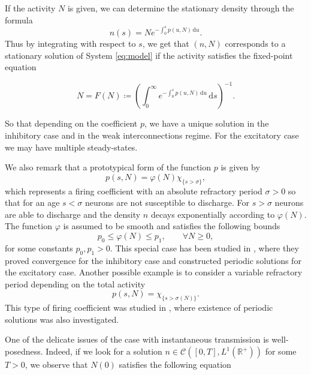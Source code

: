 \documentclass[11pt,a4paper]{article}
\newcommand{\R}{\mathbb{R}}
\newcommand{\dd}{\mathrm{d}}
\begin{document}
If the activity $N$ is given, we can determine the stationary density through the formula
\begin{equation}
\label{solest1}
n(s)=Ne^{-\int_0^sp(u,N)\,\dd u}.
\end{equation}
Thus by integrating with respect to $s$, we get that $(n,N)$ corresponds to a stationary solution of System \eqref{eq:model} if the activity satisfies the fixed-point equation

\begin{equation}
	\label{fixN1}
	N=F(N)\coloneqq\left(\int_0^\infty e^{-\int_0^sp(u,N)\,\dd u}\,\dd s\right)^{-1}.
\end{equation}

So that depending on the coefficient $p$, we have a unique solution in the inhibitory case and in the weak interconnections regime. For the excitatory case we may have multiple steady-states.

We also remark that a prototypical form of the function $p$ is given by
\begin{equation}
\label{p-esp}
p(s,N)=\varphi(N)\chi_{\{s>\sigma\}},
\end{equation}
which represents a firing coefficient with an absolute refractory period $\sigma>0$ so that for an age $s<\sigma$ neurons are not susceptible to discharge. For $s>\sigma$ neurons are able to discharge and the density $n$ decays exponentially according to $\varphi(N)$. The function $\varphi$ is assumed to be smooth and satisfies the following bounds
\begin{equation*}
p_0\le\varphi(N)\le p_1, \qquad\forall N\ge0,
\end{equation*}
for some constants $p_0,p_1>0$. This special case has been studied in \cite{pakdaman2009dynamics,torres2021elapsed}, where they proved convergence for the inhibitory case and constructed periodic solutions for the excitatory case. Another possible example is to consider a variable refractory period depending on the total activity
\begin{equation}
\label{p-esp2}
    p(s,N)=\chi_{\{s>\sigma(N)\}}.
\end{equation}
This type of firing coefficient was studied in \cite{pakdaman2013relaxation}, where existence of periodic solutions was also investigated.

One of the delicate issues of the case with instantaneous transmission is well-posedness. Indeed, if we look for a solution $n\in\mathcal{C}([0,T],L^1(\R^+))$ for some $T>0$, we observe that $N(0)$ satisfies the following equation
\end{document}
